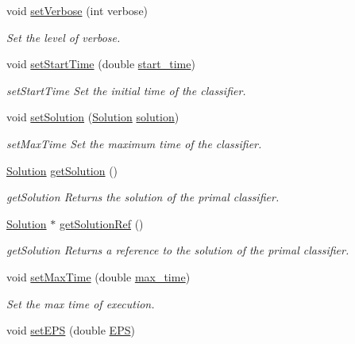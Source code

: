 \begin{DoxyCompactItemize}
void \hyperlink{class_classifier_ac9e142714dff18a8caa5c9e3d7cfcbfc}{set\+Verbose} (int verbose)
\begin{DoxyCompactList}\small\item\em Set the level of verbose. \end{DoxyCompactList}\item 
void \hyperlink{class_classifier_a92fd489e75afe8b1bd2c88c478cf8f60}{set\+Start\+Time} (double \hyperlink{class_classifier_a7ed1462d90a26a7f3050be4c29ad6ff7}{start\+\_\+time})
\begin{DoxyCompactList}\small\item\em set\+Start\+Time Set the initial time of the classifier. \end{DoxyCompactList}\item 
void \hyperlink{class_classifier_a2eb8d760224eba3091c108155996d3d9}{set\+Solution} (\hyperlink{class_solution}{Solution} \hyperlink{class_classifier_adecdc97505c2911a66e240ad0fefd9ea}{solution})
\begin{DoxyCompactList}\small\item\em set\+Max\+Time Set the maximum time of the classifier. \end{DoxyCompactList}\item 
\hyperlink{class_solution}{Solution} \hyperlink{class_classifier_a225887f545e5ad0a2bb414f969771cca}{get\+Solution} ()
\begin{DoxyCompactList}\small\item\em get\+Solution Returns the solution of the primal classifier. \end{DoxyCompactList}\item 
\hyperlink{class_solution}{Solution} $\ast$ \hyperlink{class_classifier_a4845fd932adb55becf78bfa4fccbea59}{get\+Solution\+Ref} ()
\begin{DoxyCompactList}\small\item\em get\+Solution Returns a reference to the solution of the primal classifier. \end{DoxyCompactList}\item 
void \hyperlink{class_classifier_a1919729daad9103144bffbd189b9fac9}{set\+Max\+Time} (double \hyperlink{class_classifier_ab7c1a6d53cbf26ea2517df83a9ab8ee0}{max\+\_\+time})
\begin{DoxyCompactList}\small\item\em Set the max time of execution. \end{DoxyCompactList}\item 
void \hyperlink{class_classifier_a47b520ded0313a3cdcab8691cdd28257}{set\+E\+PS} (double \hyperlink{class_classifier_a690342152fdf43a17e67afad15d86503}{E\+PS})

\end{DoxyCompactItemize}
